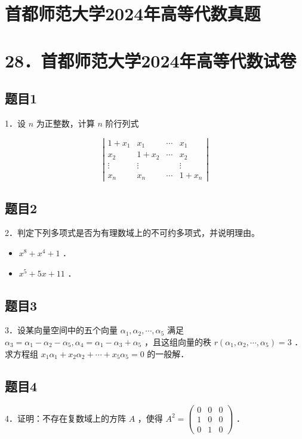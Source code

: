 \documentclass{article}
\begin{document}
\section*{首都师范大学2024年高等代数真题}
\section*{28．首都师范大学2024年高等代数试卷}

\subsection{题目1}
1．设 \(n\) 为正整数，计算 \(n\) 阶行列式

\[
\left|\begin{array}{cccc}
1+x_{1} & x_{1} & \cdots & x_{1} \\
x_{2} & 1+x_{2} & \cdots & x_{2} \\
\vdots & \vdots & & \vdots \\
x_{n} & x_{n} & \cdots & 1+x_{n}
\end{array}\right|
\]

\subsection{题目2}
2．判定下列多项式是否为有理数域上的不可约多项式，并说明理由。

\begin{itemize}
  \item[（1）] \(x^{8}+x^{4}+1\) ．
  \item[（2）] \(x^{5}+5 x+11\) ．
\end{itemize}

\subsection{题目3}
3．设某向量空间中的五个向量 \(\alpha_{1}, \alpha_{2}, \cdots, \alpha_{5}\) 满足 \(\alpha_{3}=\alpha_{1}-\alpha_{2}-\alpha_{5}, \alpha_{4}=\alpha_{1}-\alpha_{3}+\alpha_{5}\) ，且这组向量的秩 \(r\left(\alpha_{1}, \alpha_{2}, \cdots, \alpha_{5}\right)=3\) ．求方程组 \(x_{1} \alpha_{1}+x_{2} \alpha_{2}+\cdots+x_{5} \alpha_{5}=0\) 的一般解．

\subsection{题目4}
4．证明：不存在复数域上的方阵 \(A\) ，使得 \(A^{2}=\left(\begin{array}{lll}0 & 0 & 0 \\ 1 & 0 & 0 \\ 0 & 1 & 0\end{array}\right)\) ．
\end{document}
